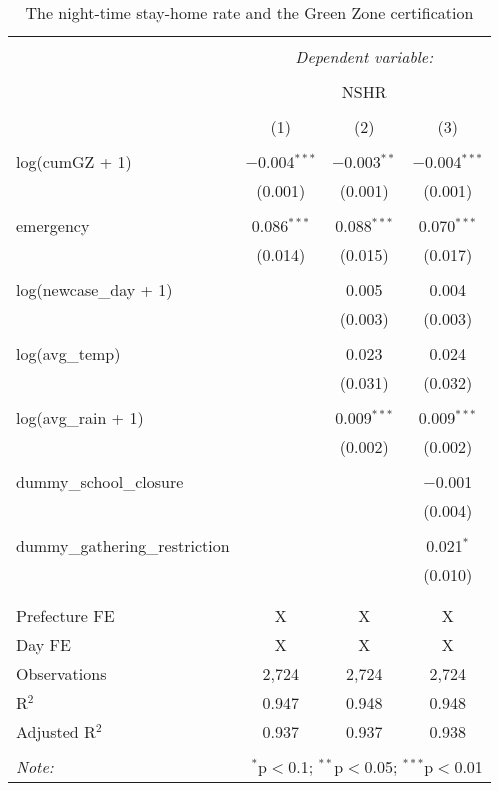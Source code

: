 
\begin{table}[!htbp] \centering 
  \caption{The night-time stay-home rate and the Green Zone certification} 
  \label{} 
\begin{tabular}{@{\extracolsep{5pt}}lccc} 
\\[-1.8ex]\hline 
\hline \\[-1.8ex] 
 & \multicolumn{3}{c}{\textit{Dependent variable:}} \\ 
\cline{2-4} 
\\[-1.8ex] & \multicolumn{3}{c}{NSHR} \\ 
\\[-1.8ex] & (1) & (2) & (3)\\ 
\hline \\[-1.8ex] 
 log(cumGZ + 1) & $-$0.004$^{***}$ & $-$0.003$^{**}$ & $-$0.004$^{***}$ \\ 
  & (0.001) & (0.001) & (0.001) \\ 
  & & & \\ 
 emergency & 0.086$^{***}$ & 0.088$^{***}$ & 0.070$^{***}$ \\ 
  & (0.014) & (0.015) & (0.017) \\ 
  & & & \\ 
 log(newcase\_day + 1) &  & 0.005 & 0.004 \\ 
  &  & (0.003) & (0.003) \\ 
  & & & \\ 
 log(avg\_temp) &  & 0.023 & 0.024 \\ 
  &  & (0.031) & (0.032) \\ 
  & & & \\ 
 log(avg\_rain + 1) &  & 0.009$^{***}$ & 0.009$^{***}$ \\ 
  &  & (0.002) & (0.002) \\ 
  & & & \\ 
 dummy\_school\_closure &  &  & $-$0.001 \\ 
  &  &  & (0.004) \\ 
  & & & \\ 
 dummy\_gathering\_restriction &  &  & 0.021$^{*}$ \\ 
  &  &  & (0.010) \\ 
  & & & \\ 
\hline \\[-1.8ex] 
Prefecture FE & X & X & X \\ 
Day FE & X & X & X \\ 
Observations & 2,724 & 2,724 & 2,724 \\ 
R$^{2}$ & 0.947 & 0.948 & 0.948 \\ 
Adjusted R$^{2}$ & 0.937 & 0.937 & 0.938 \\ 
\hline 
\hline \\[-1.8ex] 
\textit{Note:}  & \multicolumn{3}{r}{$^{*}$p$<$0.1; $^{**}$p$<$0.05; $^{***}$p$<$0.01} \\ 
\end{tabular} 
\end{table} 
